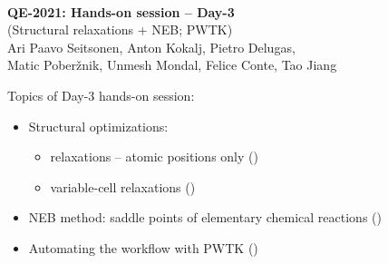\documentclass[landscape]{foils}
\begin{document}

\blue
~\\
\vspace*{4cm}
\MyLogo{~}
\vspace{3em}
\begin{center}
  {\burgundy\LARGE\bf QE-2021: Hands-on session -- Day-3}\\[2em]
  {\burgundy\LARGE (Structural relaxations + NEB; PWTK)}
  ~\\[1.5em]
    \large Ari Paavo Seitsonen, Anton Kokalj, Pietro Delugas,\\
  Matic Pober\v{z}nik, Unmesh Mondal, Felice Conte, Tao Jiang
\end{center}

Topics of Day-3 hands-on session:
\begin{itemize}
\item Structural optimizations:
  \begin{itemize}
  \item relaxations -- atomic positions only ()
  \item variable-cell relaxations ()
  \end{itemize}
\item NEB method: saddle points of elementary chemical
  reactions ()
\item Automating the workflow with PWTK
  ()\\
\end{itemize}
\end{document}
